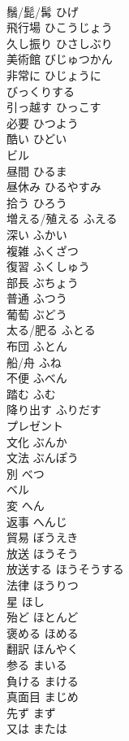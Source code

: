 \documentclass[8pt]{extreport}
\begin{document}
\begin{CJK}{UTF8}{min}
\\	鬚/髭/髯	ひげ	
\\	飛行場	ひこうじょう	
\\	久し振り	ひさしぶり	
\\	美術館	びじゅつかん	
\\	非常に	ひじょうに	
\\	びっくりする		
\\	引っ越す	ひっこす	
\\	必要	ひつよう	
\\	酷い	ひどい	
\\	ビル		
\\	昼間	ひるま	
\\	昼休み	ひるやすみ	
\\	拾う	ひろう	
\\	増える/殖える	ふえる	
\\	深い	ふかい	
\\	複雑	ふくざつ	
\\	復習	ふくしゅう	
\\	部長	ぶちょう	
\\	普通	ふつう	
\\	葡萄	ぶどう	
\\	太る/肥る	ふとる	
\\	布団	ふとん	
\\	船/舟	ふね	
\\	不便	ふべん	
\\	踏む	ふむ	
\\	降り出す	ふりだす	
\\	プレゼント		
\\	文化	ぶんか	
\\	文法	ぶんぽう	
\\	別	べつ	
\\	ベル		
\\	変	へん	
\\	返事	へんじ	
\\	貿易	ぼうえき	
\\	放送	ほうそう	
\\	放送する	ほうそうする	
\\	法律	ほうりつ	
\\	星	ほし	
\\	殆ど	ほとんど	
\\	褒める	ほめる	
\\	翻訳	ほんやく	
\\	参る	まいる	
\\	負ける	まける	
\\	真面目	まじめ	
\\	先ず	まず	
\\	又は	または	

\end{CJK}
\end{document}
